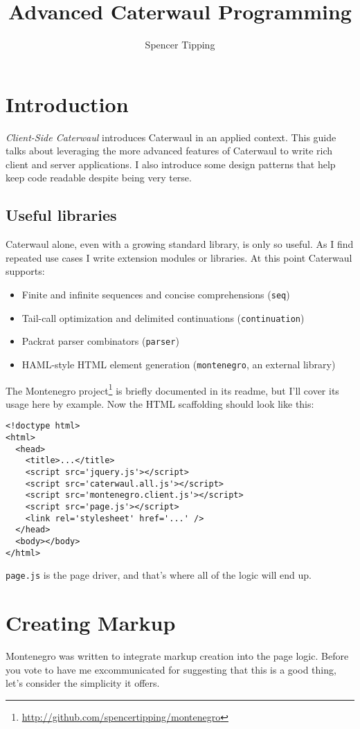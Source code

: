 \documentclass{report}
\title{Advanced Caterwaul Programming}
\author{Spencer Tipping}
\begin{document}
\maketitle{}
\tableofcontents{}

\chapter{Introduction}
  {\it Client-Side Caterwaul} introduces Caterwaul in an applied context. This guide talks about leveraging the more advanced features of Caterwaul to write rich client and server
  applications. I also introduce some design patterns that help keep code readable despite being very terse.

\section{Useful libraries}
    Caterwaul alone, even with a growing standard library, is only so useful. As I find repeated use cases I write extension modules or libraries. At this point Caterwaul supports:

\begin{itemize}
\item{Finite and infinite sequences and concise comprehensions ({\tt seq})}
\item{Tail-call optimization and delimited continuations ({\tt continuation})}
\item{Packrat parser combinators ({\tt parser})}
\item{HAML-style HTML element generation ({\tt montenegro}, an external library)}
\end{itemize}

    The Montenegro project\footnote{\url{http://github.com/spencertipping/montenegro}} is briefly documented in its readme, but I'll cover its usage here by example. Now the HTML scaffolding
    should look like this:

\begin{verbatim}
<!doctype html>
<html>
  <head>
    <title>...</title>
    <script src='jquery.js'></script>
    <script src='caterwaul.all.js'></script>
    <script src='montenegro.client.js'></script>
    <script src='page.js'></script>
    <link rel='stylesheet' href='...' />
  </head>
  <body></body>
</html>
\end{verbatim}

    {\tt page.js} is the page driver, and that's where all of the logic will end up.
\chapter{Creating Markup}
  Montenegro was written to integrate markup creation into the page logic. Before you vote to have me excommunicated for suggesting that this is a good thing, let's consider the simplicity it
  offers.
\end{document}
